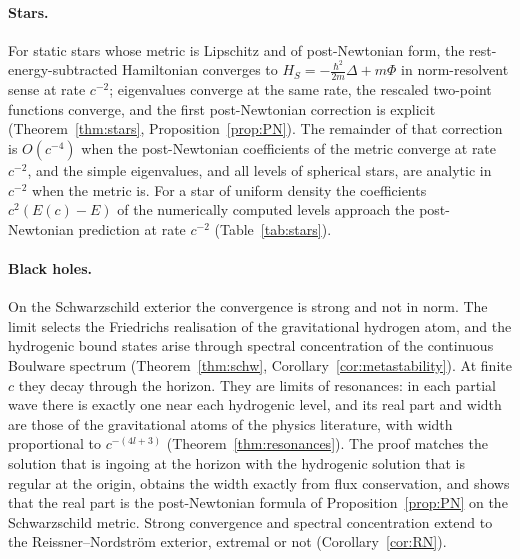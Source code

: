 \documentclass[%
 aip,
 jmp,
 amsmath,amssymb,
 reprint, onecolumn
]{revtex4-1}
\theoremstyle{definition}
\theoremstyle{remark}
\begin{document}
\paragraph{Stars.} For static stars whose metric is Lipschitz and of
post-Newtonian form, the rest-energy-subtracted Hamiltonian converges to
$H_S=-\frac{\hbar^2}{2m}\Delta+m\Phi$ in norm-resolvent sense at rate
$c^{-2}$; eigenvalues converge at the same rate, the rescaled two-point
functions converge, and the first post-Newtonian correction is explicit
(Theorem~\ref{thm:stars}, Proposition~\ref{prop:PN}). The remainder of
that correction is $O(c^{-4})$ when the post-Newtonian coefficients of
the metric converge at rate $c^{-2}$, and the simple eigenvalues, and all
levels of spherical stars, are analytic in $c^{-2}$ when the metric
is. For a star of uniform density the
coefficients $c^2(E(c)-E)$ of the numerically computed levels approach
the post-Newtonian prediction at rate $c^{-2}$
(Table~\ref{tab:stars}).

\paragraph{Black holes.} On the Schwarzschild exterior the convergence
is strong and not in norm. The limit selects the Friedrichs
realisation of the gravitational hydrogen atom, and the hydrogenic bound
states arise through spectral concentration of the continuous Boulware
spectrum (Theorem~\ref{thm:schw}, Corollary~\ref{cor:metastability}).
At finite $c$ they decay through the horizon. They are limits of
resonances: in each partial wave there is exactly one near each
hydrogenic level, and its real part and width are those of the
gravitational atoms of the physics literature, with width proportional
to $c^{-(4l+3)}$ (Theorem~\ref{thm:resonances}). The proof matches the
solution that is ingoing at the horizon with the hydrogenic solution
that is regular at the origin, obtains the width exactly from flux
conservation, and shows that the real part is the post-Newtonian
formula of Proposition~\ref{prop:PN} on the Schwarzschild metric. Strong
convergence and spectral concentration extend to the Reissner--Nordstr\"om
exterior, extremal or not (Corollary~\ref{cor:RN}).
\end{document}

